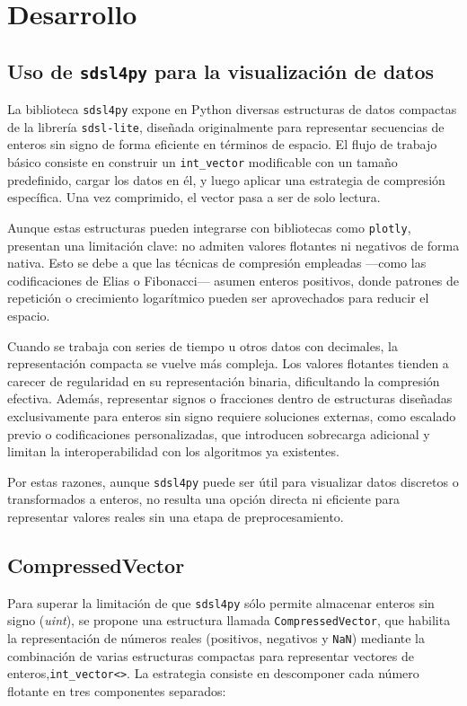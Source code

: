 \section{Desarrollo}


\subsection{Uso de \texttt{sdsl4py} para la visualización de datos}

La biblioteca \texttt{sdsl4py} expone en Python diversas estructuras de datos compactas de la librería \texttt{sdsl-lite}, diseñada originalmente para representar secuencias de enteros sin signo de forma eficiente en términos de espacio. El flujo de trabajo básico consiste en construir un \texttt{int\_vector} modificable con un tamaño predefinido, cargar los datos en él, y luego aplicar una estrategia de compresión específica. Una vez comprimido, el vector pasa a ser de solo lectura.

Aunque estas estructuras pueden integrarse con bibliotecas como \texttt{plotly}, presentan una limitación clave: no admiten valores flotantes ni negativos de forma nativa. Esto se debe a que las técnicas de compresión empleadas —como las codificaciones de Elias o Fibonacci— asumen enteros positivos, donde patrones de repetición o crecimiento logarítmico pueden ser aprovechados para reducir el espacio.

Cuando se trabaja con series de tiempo u otros datos con decimales, la representación compacta se vuelve más compleja. Los valores flotantes tienden a carecer de regularidad en su representación binaria, dificultando la compresión efectiva. Además, representar signos o fracciones dentro de estructuras diseñadas exclusivamente para enteros sin signo requiere soluciones externas, como escalado previo o codificaciones personalizadas, que introducen sobrecarga adicional y limitan la interoperabilidad con los algoritmos ya existentes.

Por estas razones, aunque \texttt{sdsl4py} puede ser útil para visualizar datos discretos o transformados a enteros, no resulta una opción directa ni eficiente para representar valores reales sin una etapa de preprocesamiento.


\subsection{CompressedVector}

Para superar la limitación de que \texttt{sdsl4py} sólo permite almacenar enteros sin signo (\textit{uint}), se propone una estructura llamada \texttt{CompressedVector}, que habilita la representación de números reales (positivos, negativos y \texttt{NaN}) mediante la combinación de varias estructuras compactas para representar vectores de enteros,\texttt{int\_vector<>}. La estrategia consiste en descomponer cada número flotante en tres componentes separados:

